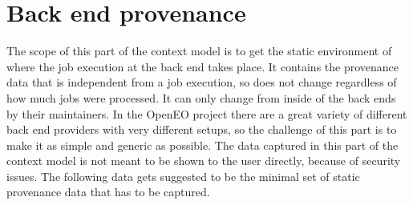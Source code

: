 \documentclass[draft,final]{vutinfth} %
\begin{document}
\section{Back end provenance}
The scope of this part of the context model is to get the static environment of where the job execution at the back end takes place. It contains the provenance data that is independent from a job execution, so does not change regardless of how much jobs were processed. It can only change from inside of the back ends by their maintainers. In the OpenEO project there are a great variety of different back end providers with very different setups, so the challenge of this part is to make it as simple and generic as possible. The data captured in this part of the context model is not meant to be shown to the user directly, because of security issues. The following data gets suggested to be the minimal set of static provenance data that has to be captured.
\end{document}
